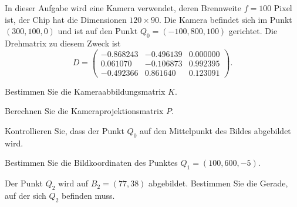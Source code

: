 In dieser Aufgabe wird eine Kamera verwendet, deren Brennweite $f=100$ Pixel ist,
der Chip hat die Dimensionen $120\times 90$.
Die Kamera befindet sich im Punkt $(300,100,0)$ und ist auf den Punkt
$Q_0=(-100,800,100)$ gerichtet.
Die Drehmatrix zu diesem Zweck ist 
\[
D=
\begin{pmatrix}
  -0.868243& -0.496139&  0.000000\\
   0.061070& -0.106873&  0.992395\\
  -0.492366&  0.861640&  0.123091
\end{pmatrix}.
\]
\begin{teilaufgaben}
\item Bestimmen Sie die Kameraabbildungsmatrix $K$.
\item Berechnen Sie die Kameraprojektionsmatrix $P$.
\item Kontrollieren Sie, dass der Punkt $Q_0$ auf den Mittelpunkt des
Bildes abgebildet wird.
\item Bestimmen Sie die Bildkoordinaten des Punktes
$Q_1 = (100,600,-5)$.
\item Der Punkt $Q_2$ wird auf $B_2=(77,38)$ abgebildet.
Bestimmen Sie die Gerade, auf der sich $Q_2$ befinden muss.
\end{teilaufgaben}


